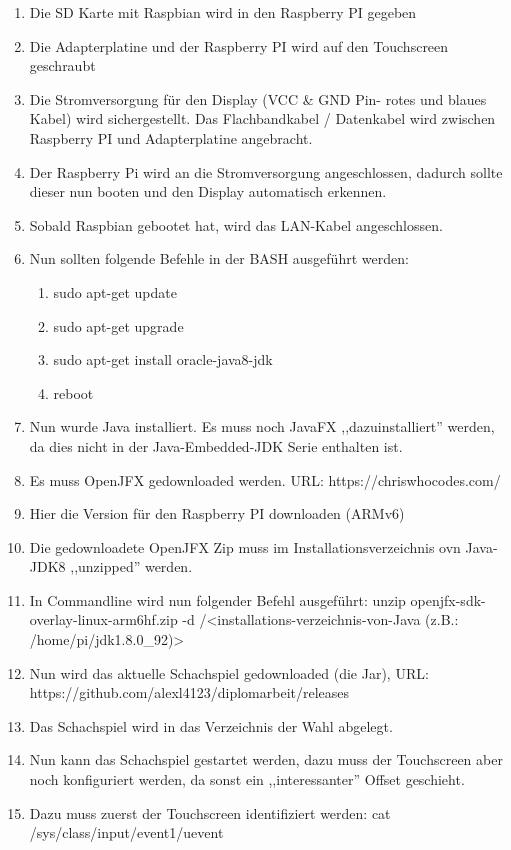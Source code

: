 \documentclass[12pt,a4paper]{article}
\begin{document}
{\begin{enumerate}
	\item{Die SD Karte mit Raspbian wird in den Raspberry PI gegeben}
	\item{Die Adapterplatine und der Raspberry PI wird auf den Touchscreen geschraubt}
	\item{Die Stromversorgung für den Display (VCC \& GND Pin- rotes und blaues Kabel) wird sichergestellt. Das Flachbandkabel / Datenkabel wird zwischen Raspberry PI und Adapterplatine angebracht.}
	\item{Der Raspberry Pi wird an die Stromversorgung angeschlossen, dadurch sollte dieser nun booten und den Display automatisch erkennen.}
	\item{Sobald Raspbian gebootet hat, wird das LAN-Kabel angeschlossen.}
	\item{Nun sollten folgende Befehle in der BASH ausgeführt werden:}
	\begin{enumerate}
		\item{sudo apt-get update}
		\item{sudo apt-get upgrade}
		\item{sudo apt-get install oracle-java8-jdk}
		\item{reboot}
	\end{enumerate}
	\item{Nun wurde Java installiert. Es muss noch JavaFX ,,dazuinstalliert'' werden, da dies nicht in der Java-Embedded-JDK Serie enthalten ist.}
	\item{Es muss OpenJFX gedownloaded werden. URL: https://chriswhocodes.com/}
	\item{Hier die Version für den Raspberry PI downloaden (ARMv6)}
	\item{Die gedownloadete OpenJFX Zip muss im Installationsverzeichnis ovn Java-JDK8 ,,unzipped'' werden.}
	\item{In Commandline wird nun folgender Befehl ausgeführt: unzip openjfx-sdk-overlay-linux-arm6hf.zip -d /<installations-verzeichnis-von-Java (z.B.: /home/pi/jdk1.8.0\_92)>}
	\item{Nun wird das aktuelle Schachspiel gedownloaded (die Jar), URL: https://github.com/alexl4123/diplomarbeit/releases}
	\item{Das Schachspiel wird in das Verzeichnis der Wahl abgelegt.}
	\item{Nun kann das Schachspiel gestartet werden, dazu muss der Touchscreen aber noch konfiguriert werden, da sonst ein ,,interessanter'' Offset geschieht.}
	\item{Dazu muss zuerst der Touchscreen identifiziert werden: cat /sys/class/input/event1/uevent}

\end{enumerate}}
\end{document}
